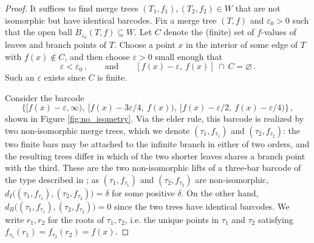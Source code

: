 \documentclass{article}
\theoremstyle{definition}
\renewcommand{\epsilon}{\varepsilon}
\begin{document}
\begin{proof}
    It suffices to find merge trees $(T_1,f_1), (T_2,f_2)\in W$ that are not isomorphic but have identical barcodes. Fix a merge tree $(T,f)$ and $\epsilon_0>0$ such that the open ball $B_{\epsilon_0}(T,f)\subseteq W$. Let $C$ denote the (finite) set of $f$-values of leaves and branch points of $T$. Choose a point $x$ in the interior of some edge of $T$ with $f(x)\notin C$, and then choose $\epsilon>0$ small enough that
    \begin{equation*}
        \epsilon < \epsilon_0\,, \qquad \text{and} \qquad [f(x)-\epsilon,\ f(x)]\ \cap\ C = \varnothing\,.
    \end{equation*}
    Such an $\epsilon$ exists since $C$ is finite.

    Consider the barcode
    \begin{equation*}
        \big\{[f(x)-\epsilon, \infty),\ [f(x)-3\epsilon/4,\ f(x)),\ [f(x)-\epsilon/2,\ f(x)-\epsilon/4)\big\}\,,
    \end{equation*}
    shown in Figure \ref{fig:no_isometry}. Via the elder rule, this barcode is realized by two non-isomorphic merge trees, which we denote $(\tau_1,f_{\tau_1})$ and $(\tau_2,f_{\tau_2})$: the two finite bars may be attached to the infinite branch in either of two orders, and the resulting trees differ in which of the two shorter leaves shares a branch point with the third. These are the two non-isomorphic lifts of a three-bar barcode of the type described in \cite[Example 10]{curry2018fiber}; as $(\tau_1,f_{\tau_1})$ and $(\tau_2,f_{\tau_2})$ are non-isomorphic, $d_I\big((\tau_1,f_{\tau_1}),(\tau_2,f_{\tau_2})\big) = \delta$ for some positive $\delta$. On the other hand, $d_B((\tau_1,f_{\tau_1}),(\tau_2,f_{\tau_2})\big) = 0$ since the two trees have identical barcodes. We write $r_1, r_2$ for the roots of $\tau_1, \tau_2$, i.e. the unique points in $\tau_1$ and $\tau_2$ satisfying $f_{\tau_1}(r_1) = f_{\tau_2}(r_2) = f(x)$.


\end{proof}
\end{document}
